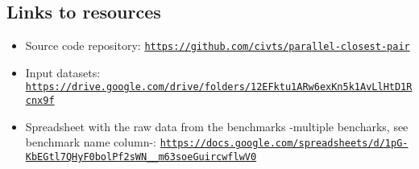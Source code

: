 \subsection{Links to resources}
\begin{itemize}
      \item Source code repository: \texttt{\url{https://github.com/civts/parallel-closest-pair}}
            \label{link:source}
      \item Input datasets: \texttt{\url{https://drive.google.com/drive/folders/12EFktu1ARw6exKn5k1AvLlHtD1Rcnx9f}}
      \item Spreadsheet with the raw data from the benchmarks -multiple bencharks, see benchmark name column-: \texttt{\url{https://docs.google.com/spreadsheets/d/1pG-KbEGtl7QHyF0bolPf2sWN__m63soeGuircwflwV0}}
            \label{link:spreadsheet}
\end{itemize}